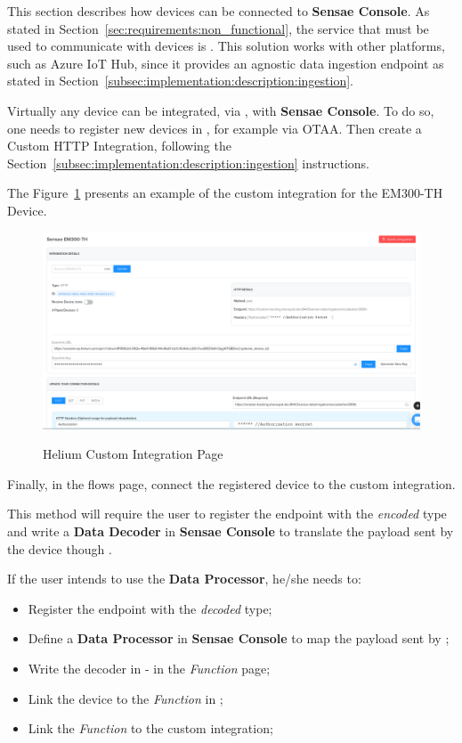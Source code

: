 This section describes how devices can be connected to \textbf{Sensae Console}. As stated in Section~\ref{sec:requirements:non_functional}, the service that must be used to communicate with devices is . This solution works with other platforms, such as Azure IoT Hub, since it provides an agnostic data ingestion endpoint as stated in Section~\ref{subsec:implementation:description:ingestion}.

Virtually any device can be integrated, via , with \textbf{Sensae Console}. To do so, one needs to register new devices in , for example via \gls{OTAA}. Then create a Custom HTTP Integration, following the Section~\ref{subsec:implementation:description:ingestion} instructions.

The Figure~\ref{fig:implementation:description:sensor:integration} presents an example of the custom integration for the EM300-TH Device.

\begin{figure}[H]
    \centering
    \resizebox{\columnwidth}{!}
    {
       \includegraphics{assets/figures/sensor/integration.png}
    }
    \caption[Helium Custom Integration Page]{Helium Custom Integration Page}
    \label{fig:implementation:description:sensor:integration}
\end{figure}

Finally, in the  flows page, connect the registered device to the custom integration.

This method will require the user to register the endpoint with the \textit{encoded} type and write a \textbf{Data Decoder} in \textbf{Sensae Console} to translate the payload sent by the device though .

If the user intends to use the \textbf{Data Processor}, he/she needs to:

\begin{itemize}
    \item Register the endpoint with the \textit{decoded} type;
    \item Define a \textbf{Data Processor} in \textbf{Sensae Console} to map the payload sent by ;
    \item Write the decoder in  - in the \textit{Function} page;
    \item Link the device to the \textit{Function} in ;
    \item Link the \textit{Function} to the custom integration;
\end{itemize}

